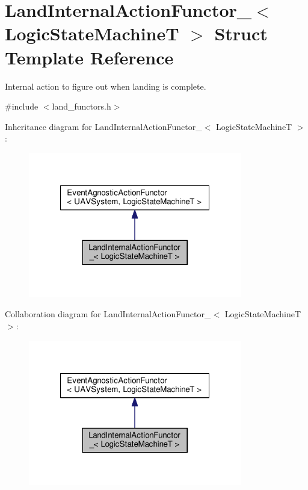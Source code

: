 \hypertarget{structLandInternalActionFunctor__}{\section{Land\-Internal\-Action\-Functor\-\_\-$<$ Logic\-State\-Machine\-T $>$ Struct Template Reference}
\label{structLandInternalActionFunctor__}
}


Internal action to figure out when landing is complete.  




{\ttfamily \#include $<$land\-\_\-functors.\-h$>$}



Inheritance diagram for Land\-Internal\-Action\-Functor\-\_\-$<$ Logic\-State\-Machine\-T $>$\-:\nopagebreak
\begin{figure}[H]
\begin{center}
\leavevmode
\includegraphics[width=264pt]{structLandInternalActionFunctor____inherit__graph}
\end{center}
\end{figure}


Collaboration diagram for Land\-Internal\-Action\-Functor\-\_\-$<$ Logic\-State\-Machine\-T $>$\-:\nopagebreak
\begin{figure}[H]
\begin{center}
\leavevmode
\includegraphics[width=264pt]{structLandInternalActionFunctor____coll__graph}
\end{center}
\end{figure}
